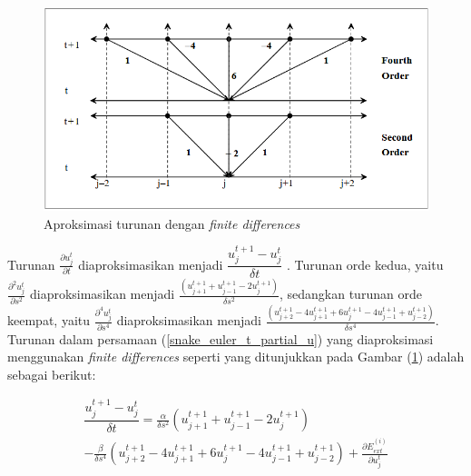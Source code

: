 \begin{figure}[H]
	\centering
	\includegraphics[width=1\textwidth]{gambar/finite_d}
	\caption{Aproksimasi turunan dengan \emph{finite differences} \citep{ivins1995everything}}
	\label{Gambar:finite_d}
\end{figure}
Turunan $\frac{\partial u^{t}_{j} }{\partial t}$ diaproksimasikan menjadi $\dfrac{ u^{t+1}_j - u^{t}_j }{\delta t}$ \citep{ivins1995everything}. Turunan orde kedua, yaitu $\frac{\partial^2 u^{t}_{j}}{\partial s^2}$ diaproksimasikan menjadi $\frac{( u^{t+1}_{j+1} + u^{t+1}_{j-1} - 2u^{t+1}_{j} )}{\delta s^2}$, sedangkan turunan orde keempat, yaitu $\frac{\partial^4 u^{t}_{j}}{\partial s^4}$ diaproksimasikan menjadi $\frac{( u^{t+1}_{j+2} - 4u^{t+1}_{j+1} + 6u^{t+1}_{j} - 4u^{t+1}_{j-1} + u^{t+1}_{j-2})}{\delta s^4}$.
Turunan dalam persamaan (\ref{snake_euler_t_partial_u}) yang diaproksimasi menggunakan \emph{finite differences} seperti yang ditunjukkan pada Gambar (\ref{Gambar:finite_d}) adalah sebagai berikut:

\begin{multline}
	\label{aprox_finite}
	\dfrac{ u^{t+1}_j - u^{t}_j }{\delta t} = \frac{\alpha}{\delta s^2}( u^{t+1}_{j+1} + u^{t+1}_{j-1} - 2u^{t+1}_{j} ) \\
	- \frac{\beta}{\delta s^4}( u^{t+1}_{j+2} - 4u^{t+1}_{j+1} + 6u^{t+1}_{j} - 4u^{t+1}_{j-1} + u^{t+1}_{j-2}) + \frac{\partial E^{(i)}_{ext} }{ \partial u^{t}_{j}}
\end{multline}

